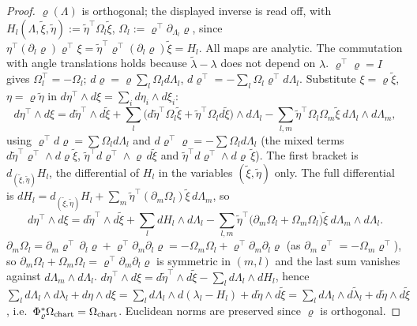 \begin{proof}
\label{stepP:p9:lift-bij} $\varrho(\Lambda)$ is orthogonal; the displayed inverse is read off, with $H_l(\Lambda,\tilde\xi,\tilde\eta):=\tilde\eta^\top\Omega_l\tilde\xi$, $\Omega_l:=\varrho^\top\partial_{\Lambda_l}\varrho$, since $\eta^\top(\partial_l\varrho)\varrho^\top\xi=\tilde\eta^\top\varrho^\top(\partial_l\varrho)\tilde\xi=H_l$. All maps are analytic. The commutation with angle translations holds because $\tilde\lambda-\lambda$ does not depend on $\lambda$.
\label{stepP:p9:lift-anti} $\varrho^\top\varrho=I$ gives $\Omega_l^\top=-\Omega_l$; $d\varrho=\varrho\sum_l\Omega_ld\Lambda_l$, $d\varrho^\top=-\sum_l\Omega_l\varrho^\top d\Lambda_l$.
\label{stepP:p9:lift-form} Substitute $\xi=\varrho\tilde\xi$, $\eta=\varrho\tilde\eta$ in $d\eta^\top\wedge d\xi=\sum_id\eta_i\wedge d\xi_i$:
\[d\eta^\top\!\wedge d\xi=d\tilde\eta^\top\!\wedge d\tilde\xi+\sum_l\big(d\tilde\eta^\top\Omega_l\tilde\xi+\tilde\eta^\top\Omega_ld\tilde\xi\big)\wedge d\Lambda_l-\sum_{l,m}\tilde\eta^\top\Omega_l\Omega_m\tilde\xi\ d\Lambda_l\wedge d\Lambda_m,\]
using $\varrho^\top d\varrho=\sum\Omega_ld\Lambda_l$ and $d\varrho^\top\varrho=-\sum\Omega_ld\Lambda_l$ (the mixed terms $d\tilde\eta^\top\varrho^\top\wedge d\varrho\tilde\xi$, $\tilde\eta^\top d\varrho^\top\wedge\varrho\,d\tilde\xi$ and $\tilde\eta^\top d\varrho^\top\wedge d\varrho\,\tilde\xi$). The first bracket is $d_{(\tilde\xi,\tilde\eta)}H_l$, the differential of $H_l$ in the variables $(\tilde\xi,\tilde\eta)$ only. The full differential is $dH_l=d_{(\tilde\xi,\tilde\eta)}H_l+\sum_m\tilde\eta^\top(\partial_m\Omega_l)\tilde\xi\,d\Lambda_m$, so
\[d\eta^\top\!\wedge d\xi=d\tilde\eta^\top\!\wedge d\tilde\xi+\sum_ldH_l\wedge d\Lambda_l-\sum_{l,m}\tilde\eta^\top\big(\partial_m\Omega_l+\Omega_m\Omega_l\big)\tilde\xi\ d\Lambda_m\wedge d\Lambda_l .\]
\label{stepP:p9:lift-mc} $\partial_m\Omega_l=\partial_m\varrho^\top\,\partial_l\varrho+\varrho^\top\partial_m\partial_l\varrho=-\Omega_m\Omega_l+\varrho^\top\partial_m\partial_l\varrho$ (as $\partial_m\varrho^\top=-\Omega_m\varrho^\top$), so $\partial_m\Omega_l+\Omega_m\Omega_l=\varrho^\top\partial_m\partial_l\varrho$ is symmetric in $(m,l)$ and the last sum vanishes against $d\Lambda_m\wedge d\Lambda_l$.
\label{stepP:p9:lift-concl} $d\eta^\top\wedge d\xi=d\tilde\eta^\top\wedge d\tilde\xi-\sum_ld\Lambda_l\wedge dH_l$, hence $\sum_ld\Lambda_l\wedge d\lambda_l+d\eta\wedge d\xi=\sum_ld\Lambda_l\wedge d(\lambda_l-H_l)+d\tilde\eta\wedge d\tilde\xi=\sum_ld\Lambda_l\wedge d\tilde\lambda_l+d\tilde\eta\wedge d\tilde\xi$, i.e.\ $\Phi_\varrho^*\Omega_{\rm chart}=\Omega_{\rm chart}$. Euclidean norms are preserved since $\varrho$ is orthogonal.
\end{proof}

